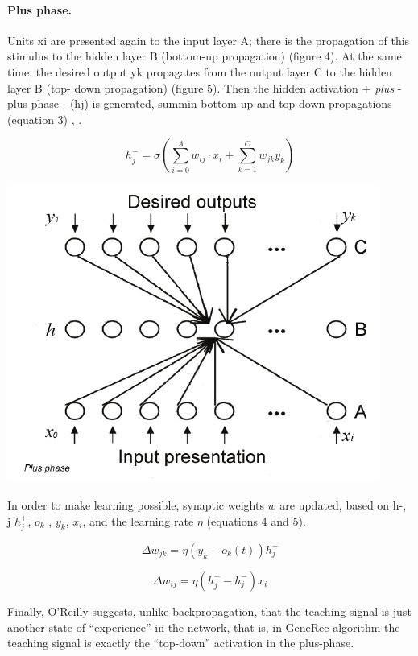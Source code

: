 \paragraph{Plus phase.} Units xi are presented again to the input layer A; there is the propagation of this stimulus to the hidden layer B (bottom-up propagation) (figure 4). At the same time, the desired output yk propagates from the output layer C to the hidden layer B (top- down propagation) (figure 5). Then the hidden activation + \emph{plus} - plus phase - (hj) is generated, summin bottom-up and top-down propagations (equation 3) \cite{o1996bio}, \cite{orru2008sabio}.

$$h_j^+ = \sigma\left( \sum_{i=0}^A w_{ij} \cdot x_i + \sum_{k=1}^C w_{jk} y_k \right)$$

\begin{center} 
\includegraphics{img/generec_plus_phase.png} \cite{orru2008sabio} 
\end{center} 

In order to make learning possible, synaptic weights $w$ are updated, based on h-, j  $h^+_j$, $o_k$ , $y_k$, $x_i$, and the learning rate $\eta$ (equations 4 and 5).

$$\Delta w_{jk} = \eta(y_k - o_k(t)) h^-_j $$

$$\Delta w_{ij} = \eta(h^+_j - h^-_j) x_i$$

Finally, O’Reilly \cite{o1998six} suggests, unlike backpropagation, that the teaching signal is just another state of “experience” in the network, that is, in GeneRec algorithm the teaching signal is exactly the “top-down” activation in the plus-phase.


